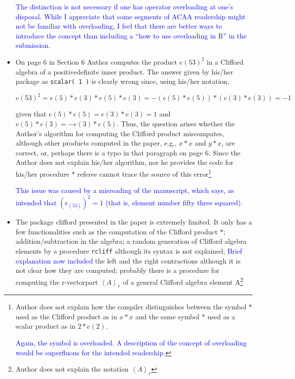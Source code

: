 \documentclass{article}
\begin{document}
\begin{itemize}
  \textcolor{blue}{The distinction is not necessary if one has
    operator overloading at one's disposal.  While I appreciate that
    some segments of ACAA readership might not be familiar with
    overloading, I feel that there are better ways to introduce the
    concept than including a ``how to use overloading in R'' in the
    submission.}

\item On page 6 in Section 6 Author computes the product $e(53)^2$ in
  a Clifford algebra of a positivedefinite inner product. The answer
  given by his/her package as \verb+scalar( 1 )+ is clearly wrong
  since, using his/her notation,

  $$
  e(53)^2=e(5)*e(3)*e(5)*e(3)=-(e(5)*e(5))*(e(3)*e(3))=-1
  $$

given that $e(5)*e(5)=e(3)*e(3)=1$ and $e(5)*e(3)=-e(3)*e(5)$.  Thus,
the question arises whether the Author’s algorithm for computing the
Clifford product miscomputes, although other products computed in the
paper, e.g., $x * x$ and $y * x$, are correct, or, perhaps there is a
typo in that paragraph on page 6.  Since the Author does not explain
his/her algorithm, nor he provides the code for his/her procedure $*$
referee cannot trace the source of this error\footnote{Author does not
explain how the compiler distinguishes between the symbol $*$ used as
the Clifford product as in $x * x$ and the same symbol $*$ used as a
scalar product as in $2 * e(2)$.

\textcolor{blue}{Again, the {\tt *} symbol is overloaded.  A
  description of the concept of overloading would be superfluous for
  the intended readership.}  }

\textcolor{blue}{This issue was caused by a misreading of the
  manuscript, which says, as intended that $(e_{(53)})^2=1$ (that is,
  element number fifty three squared).}

\item The package clifford presented in the paper is extremely
  limited. It only has a few functionalities such as the computation
  of the Clifford product $*$; addition/subtraction in the algebra; a
  random generation of Clifford algebra elements by a procedure
  \verb+rcliff+ although its syntax is not explained;
  \textcolor{blue}{Brief explanation now included} the left and the
  right contractions although it is not clear how they are computed;
  probably there is a procedure for computing the r-vectorpart
  $\left\langle A\right\rangle_r$ of a general Clifford algebra
  element A\footnote{ Author does not explain the notation
  $\left\langle A\right\rangle_r$

}
\end{itemize}
\end{document}

